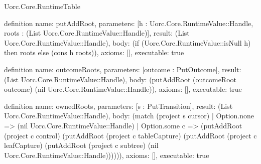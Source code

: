 \begin{lexlean}{Uorc.Core.RuntimeTable}
\begin{semanticmodule}
definition{
  name: putAddRoot,
  parameters: [h : Uorc.Core.RuntimeValue::Handle, roots : (List Uorc.Core.RuntimeValue::Handle)],
  result: (List Uorc.Core.RuntimeValue::Handle),
  body: (if (Uorc.Core.RuntimeValue::isNull h) then roots else (cons h roots)),
  axioms: [],
  executable: true
}

definition{
  name: outcomeRoots,
  parameters: [outcome : PutOutcome],
  result: (List Uorc.Core.RuntimeValue::Handle),
  body: (putAddRoot (outcomeRoot outcome) (nil Uorc.Core.RuntimeValue::Handle)),
  axioms: [],
  executable: true
}

definition{
  name: ownedRoots,
  parameters: [s : PutTransition],
  result: (List Uorc.Core.RuntimeValue::Handle),
  body: (match (project s cursor)
    | Option.none => (nil Uorc.Core.RuntimeValue::Handle)
    | Option.some c => (putAddRoot (project c control) (putAddRoot (project c tableCapture) (putAddRoot (project c leafCapture) (putAddRoot (project c subtree) (nil Uorc.Core.RuntimeValue::Handle)))))),
  axioms: [],
  executable: true
}


\end{semanticmodule}
\end{lexlean}
